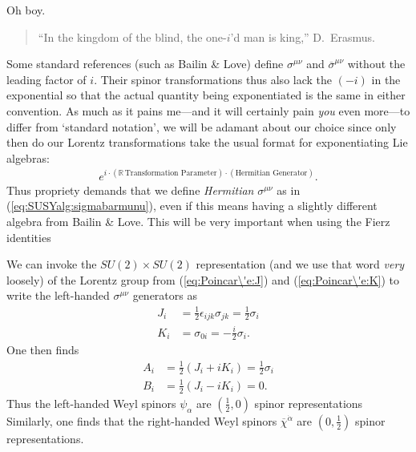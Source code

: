 \begin{example}[Factors of $i$] Oh boy.
\begin{quote}
``In the kingdom of the blind, the one-$i$'d man is king,'' D.\ Erasmus.
\end{quote}
% 
Some standard references (such as Bailin \& Love\footnotemark) define $\sigma^{\mu\nu}$ and $\overline\sigma^{\mu\nu}$ without the leading factor of $i$. Their spinor transformations thus also lack the $(-i)$ in the exponential so that the actual quantity being exponentiated is the same in either convention. As much as it pains me---and it will certainly pain \textit{you} even more---to differ from `standard notation', we will be adamant about our choice since only then do our Lorentz transformations take the usual format for exponentiating Lie algebras:
    \begin{align}
        e^{i\cdot(\mathbb R\,\text{Transformation Parameter})\cdot(\text{Hermitian Generator})}.
    \end{align} 
Thus propriety demands that we define \textit{Hermitian} $\sigma^{\mu\nu}$ as in  (\ref{eq:SUSYalg:sigmabarmunu}), even if this means having a slightly different algebra from Bailin \& Love. This will be very important when using the Fierz identities
\end{example}

We can invoke the $SU(2)\times SU(2)$ representation (and we use that word \emph{very} loosely) of the Lorentz group from (\ref{eq:Poincar\'e:J}) and (\ref{eq:Poincar\'e:K}) to write the left-handed $\sigma^{\mu\nu}$ generators as
\begin{align}
    J_i &= \frac 12 \epsilon_{ijk}\sigma_{jk} = \frac 12 \sigma_i\label{eq:SUSYalg:Jpauli}\\
    K_i &= \sigma_{0i} = -\frac i2 \sigma_i.\label{eq:SUSYalg:Kpauli}
\end{align}
One then finds
\begin{align}
    A_i &= \frac 12 (J_i+iK_i) = \frac 12 \sigma_i\\
    B_i &= \frac 12 (J_i - iK_i) = 0.
\end{align}
Thus the left-handed Weyl spinors $\psi_\alpha$ are $(\frac 12, 0)$ spinor representations Similarly, one finds that the right-handed Weyl spinors $\overline \chi^{\dot\alpha}$ are $(0,\frac 12)$ spinor representations.

